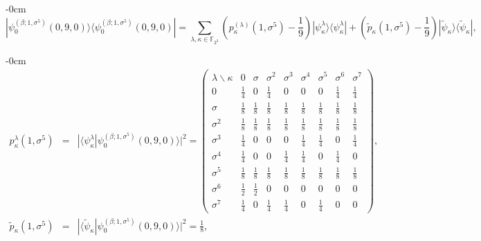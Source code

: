 \documentclass[quantumrep,article,submit,pdftex,moreauthors]{Definitions/mdpi}
\begin{document}
\begin{adjustwidth}{-\extralength}{0cm}
\begin{equation}
  |\psi _{0}^{(\beta ;1, \sigma^{5})}(0,9,0)\rangle
  \langle \psi_{0}^{(\beta;1,\sigma^{5})}(0,9,0)|
  = \sum_{\lambda ,\kappa \in \mathbb{F}_{2^{3}}}
  \left( p_{\kappa }^{(\lambda )}(1,\sigma ^{5})-\frac{1}{9}\right)
  |\psi_{\kappa}^{\lambda }\rangle \langle \psi_{\kappa }^{\lambda }|
  + \left( \tilde{p}_{\kappa }(1,\sigma ^{5})-\frac{1}{9}\right)
  |\tilde{\psi}_{\kappa }\rangle \langle \tilde{\psi}_{\kappa }|,
\end{equation}
\end{adjustwidth}

\begin{adjustwidth}{-\extralength}{0cm}
\begin{eqnarray}
  p_{\kappa}^{\lambda}(1,\sigma^{5})
  &=& |\langle \psi_{\kappa }^{\lambda}
  |\psi_{0}^{(\beta ;1,\sigma ^{5})}(0,9,0)\rangle|^{2}
  = \left(\begin{array}{ccccccccc} \lambda \backslash \kappa  & 0 & \sigma  &
      \sigma ^{2} & \sigma ^{3} & \sigma^{4} & \sigma ^{5} & \sigma ^{6} &
      \sigma ^{7} \\ 
    0 & \frac{1}{4} & 0 & \frac{1}{4} & 0 & 0 & 0 & \frac{1}{4} & \frac{1}{4} \\
    [6pt]
    \sigma & \frac{1}{8} & \frac{1}{8} & \frac{1}{8} & \frac{1}{8} & \frac{1}{8}
           & \frac{1}{8} & \frac{1}{8} & \frac{1}{8} \\ [6pt]
    \sigma^{2} & \frac{1}{8} & \frac{1}{8} & \frac{1}{8} & \frac{1}{8} &
    \frac{1}{8} & \frac{1}{8} & \frac{1}{8} & \frac{1}{8} \\  [6pt]
    \sigma^{3} & \frac{1}{4} & 0 & 0 & 0 & \frac{1}{4} & \frac{1}{4} & 0 &
    \frac{1}{4} \\  [6pt] \sigma^{4} & \frac{1}{4} & 0 & 0 & \frac{1}{4} &
    \frac{1}{4} & 0 & \frac{1}{4} & 0 \\  [6pt]
    \sigma^{5} & \frac{1}{8} & \frac{1}{8} & \frac{1}{8} & \frac{1}{8} &
    \frac{1}{8} & \frac{1}{8} & \frac{1}{8} & \frac{1}{8} \\  [6pt] \sigma^{6} &
    \frac{1}{2} & \frac{1}{2} & 0 & 0 & 0 & 0 & 0 & 0 \\  [6pt]
    \sigma^{7} & \frac{1}{4} & 0 & \frac{1}{4} & \frac{1}{4} & 0 & \frac{1}{4} &
    0 & 0
  \end{array}\right), \\
  \tilde{p}_{\kappa }(1,\sigma^{5})
  &=& |\langle \tilde\psi_\kappa | \psi_0^{(\beta;1,\sigma^5)}(0,9,0)\rangle|^2
  = \frac{1}{8},%
\end{eqnarray}
\end{adjustwidth}
\end{document}
